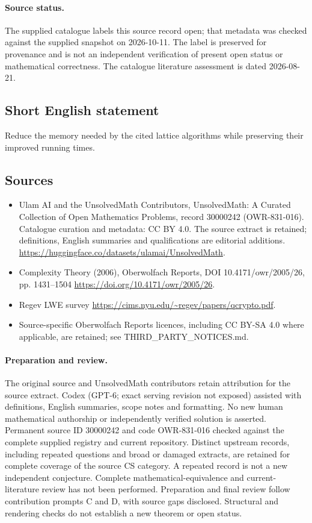 \documentclass[11pt]{article}
\begin{document}
\paragraph{Source status.}
The supplied catalogue labels this source record open; that metadata was checked against the supplied snapshot on 2026-10-11. The label is preserved for provenance and is not an independent verification of present open status or mathematical correctness. The catalogue literature assessment is dated 2026-08-21.
\subsection{Short English statement}
Reduce the memory needed by the cited lattice algorithms while preserving their improved running times.
\subsection{Sources}
\begin{itemize}
\item[S1] Ulam AI and the UnsolvedMath Contributors, UnsolvedMath: A Curated Collection of Open Mathematics Problems, record 30000242 (OWR-831-016). Catalogue curation and metadata: CC BY 4.0. The source extract is retained; definitions, English summaries and qualifications are editorial additions.
\url{https://huggingface.co/datasets/ulamai/UnsolvedMath}.
\item[S2] Complexity Theory (2006), Oberwolfach Reports, DOI 10.4171/owr/2005/26, pp. 1431--1504
\url{https://doi.org/10.4171/owr/2005/26}.
\item[S3] Regev LWE survey
\url{https://cims.nyu.edu/~regev/papers/qcrypto.pdf}.
\item Source-specific Oberwolfach Reports licences, including CC BY-SA 4.0 where applicable, are retained; see THIRD\_PARTY\_NOTICES.md.
\end{itemize}
\paragraph{Preparation and review.}
The original source and UnsolvedMath contributors retain attribution for the source extract. Codex (GPT-6; exact serving revision not exposed) assisted with definitions, English summaries, scope notes and formatting. No new human mathematical authorship or independently verified solution is asserted. Permanent source ID 30000242 and code OWR-831-016 checked against the complete supplied registry and current repository. Distinct upstream records, including repeated questions and broad or damaged extracts, are retained for complete coverage of the source CS category. A repeated record is not a new independent conjecture. Complete mathematical-equivalence and current-literature review has not been performed. Preparation and final review follow contribution prompts C and D, with source gaps disclosed. Structural and rendering checks do not establish a new theorem or open status.
\label{end:30000242}
\end{document}
